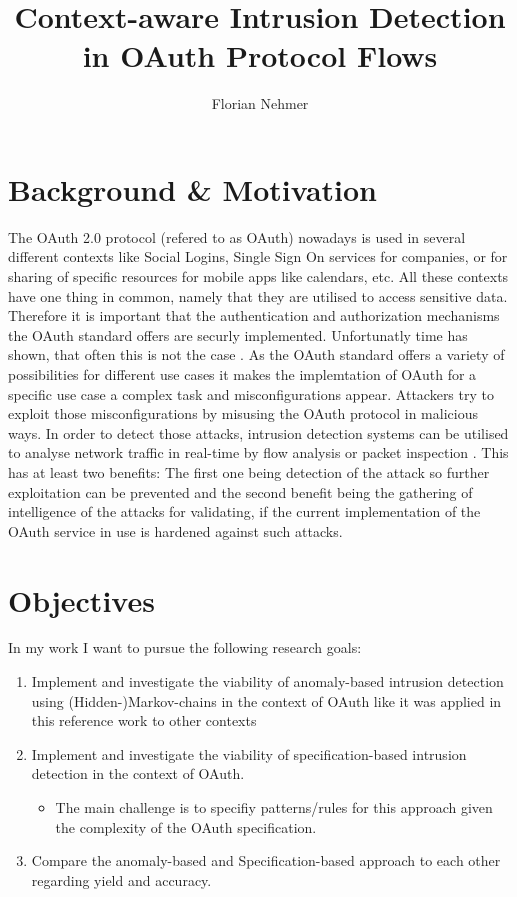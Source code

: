 \documentclass{article}
\title{Context-aware Intrusion Detection in OAuth Protocol Flows}
\author{Florian Nehmer}
\begin{document}
\maketitle

\section{Background \& Motivation}
The OAuth 2.0 protocol \cite{rfc6749} (refered to as OAuth) nowadays is used in several different contexts like Social Logins, Single Sign On services for companies, or for sharing of specific resources for mobile apps like calendars, etc. All these contexts have one thing in common, namely that they are utilised to access sensitive data. Therefore it is important that the authentication and authorization mechanisms the OAuth standard offers are securly implemented. Unfortunatly time has shown, that often this is not the case \cite{Li2019}. As the OAuth standard offers a variety of possibilities for different use cases it makes the implemtation of OAuth for a specific use case a complex task and misconfigurations appear. Attackers try to exploit those misconfigurations by misusing the OAuth protocol in malicious ways. In order to detect those attacks, intrusion detection systems can be utilised to analyse network traffic in real-time by flow analysis or packet inspection \cite{Liu2019}. This has at least two benefits: The first one being detection of the attack so further exploitation can be prevented and the second benefit being the gathering of intelligence of the attacks for validating, if the current implementation of the OAuth service in use is hardened against such attacks.

\section{Objectives}
In my work I want to pursue the following research goals:

\begin{enumerate}
    \item Implement and investigate the viability of anomaly-based intrusion detection using (Hidden-)Markov-chains in the context of OAuth like it was applied in this reference work to other contexts \cite{sperotto2011}
    \item Implement and investigate the viability of specification-based intrusion detection in the context of OAuth.
    \begin{itemize}
        \item The main challenge is to specifiy patterns/rules for this approach given the complexity of the OAuth specification. 
    \end{itemize}
    \item Compare the anomaly-based and Specification-based approach to each other regarding yield and accuracy.
\end{enumerate}
\end{document}
